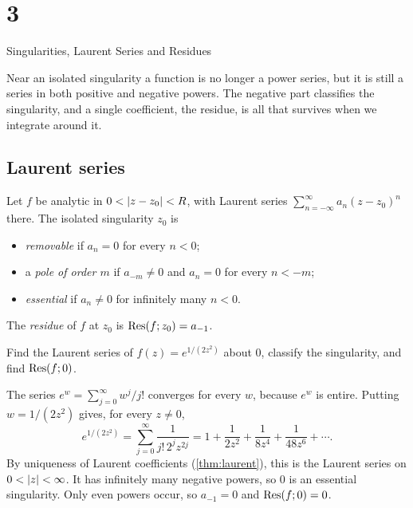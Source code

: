 \chapter{3}{Singularities, Laurent Series and Residues}

Near an isolated singularity a function is no longer a power series, but it is
still a series in both positive and negative powers. The negative part
classifies the singularity, and a single coefficient, the residue, is all
that survives when we integrate around it.

\section{Laurent series}\label{sec:laurent}



\begin{definition}\label{def:singularities}
  Let $f$ be analytic in $0 < \lvert z - z_0\rvert < R$, with Laurent series
  $\sum_{n=-\infty}^{\infty} a_n (z - z_0)^n$ there. The isolated singularity
  $z_0$ is
  \begin{itemize}
    \item \emph{removable} if $a_n = 0$ for every $n < 0$;
    \item a \emph{pole of order $m$} if $a_{-m} \neq 0$ and $a_n = 0$ for
      every $n < -m$;
    \item \emph{essential} if $a_n \neq 0$ for infinitely many $n < 0$.
  \end{itemize}
  The \emph{residue} of $f$ at $z_0$ is $\operatorname{Res}(f; z_0) = a_{-1}$.
\end{definition}

\begin{exercise}\label{ex:exp-inverse-square}
  Find the Laurent series of $f(z) = e^{1/(2z^2)}$ about $0$, classify the
  singularity, and find $\operatorname{Res}(f; 0)$.
\end{exercise}

\begin{solution}
  The series $e^w = \sum_{j=0}^{\infty} w^j / j!$ converges for every $w$,
  because $e^w$ is entire. Putting $w = 1/(2z^2)$ gives, for every $z \neq 0$,
  \[
    e^{1/(2z^2)}
    = \sum_{j=0}^{\infty} \frac{1}{j! \, 2^j z^{2j}}
    = 1 + \frac{1}{2z^2} + \frac{1}{8z^4} + \frac{1}{48z^6} + \dotsb.
  \]
  By uniqueness of Laurent coefficients (\cref{thm:laurent}), this is the
  Laurent series on $0 < \lvert z\rvert < \infty$. It has infinitely many negative
  powers, so $0$ is an essential singularity. Only even powers occur, so
  $a_{-1} = 0$ and $\operatorname{Res}(f; 0) = 0$.
\end{solution}

